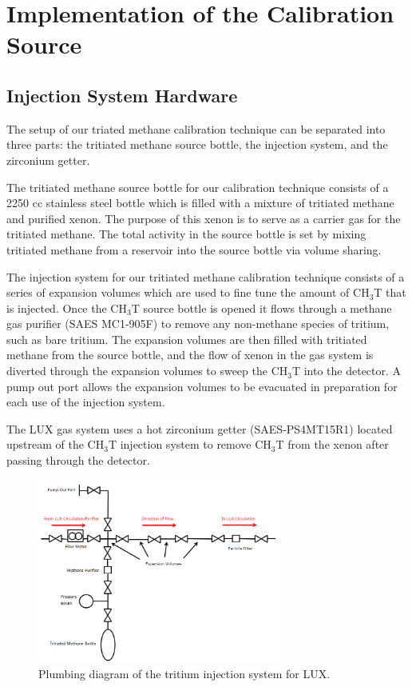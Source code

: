 \section{Implementation of the Calibration Source}

\subsection{Injection System Hardware}

The setup of our triated methane calibration technique can be separated into three parts: the tritiated methane source bottle, the injection system,  and the zirconium getter.

The tritiated methane source bottle for our calibration technique consists of a 2250 cc stainless steel bottle which is filled with a mixture of tritiated methane and purified xenon.  The purpose of this xenon is to serve as a carrier gas for the tritiated methane.  The total activity in the source bottle is set by mixing tritiated methane from a reservoir into the source bottle via volume sharing.

The injection system for our tritiated methane calibration technique consists of a series of expansion volumes which are used to fine tune the amount of CH$_3$T that is injected.  Once the CH$_3$T source bottle is opened it flows through a methane gas purifier (SAES MC1-905F) to remove any non-methane species of tritium, such as bare tritium. The expansion volumes are then filled with tritiated methane from the source bottle, and the flow of xenon in the gas system is diverted through the expansion volumes to sweep the CH$_3$T into the detector.  A pump out port allows the expansion volumes to be evacuated in preparation for each use of the injection system.  

The LUX gas system uses a hot zirconium getter (SAES-PS4MT15R1) located upstream of the CH$_3$T injection system to remove CH$_3$T from the xenon after passing through the detector.  

\begin{figure}[H]\centering
\includegraphics[width=80mm]{TritiumPlumbing.png}
\caption{Plumbing diagram of the tritium injection system for LUX.}
\label{fig:Removal}
\end{figure}

